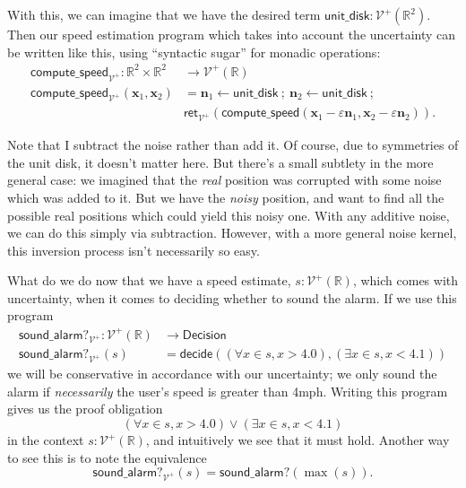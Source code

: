 \documentclass{article}           %
\newcommand{\R}{\mathbb{R}}
\newcommand{\Viet}{{\mathcal{V}^+}}
\newcommand{\ret}[1]{\mathsf{ret}_{#1}}
\newcommand{\ve}[1]{\mathbf{#1}}
\newcommand{\then}{\ ;\ }
\begin{document}
With this, we can imagine that we have the desired term $\mathsf{unit\_disk} : \Viet(\R^2)$. Then our speed estimation program which takes into account the uncertainty can be written like this, using ``syntactic sugar'' for monadic operations:
\begin{align*}
\mathsf{compute\_speed}_\Viet : \R^2 \times \R^2 &\to \Viet(\R)
\\ \mathsf{compute\_speed}_\Viet (\ve{x}_1, \ve{x}_2) &= 
  \ve{n}_1 \leftarrow \mathsf{unit\_disk} 
  \then
  \ve{n}_2 \leftarrow \mathsf{unit\_disk}
  \then
  \\ &\ret{\Viet} \left( \mathsf{compute\_speed}(\ve{x}_1 - \varepsilon \ve{n}_1, \ve{x}_2 - \varepsilon \ve{n}_2) \right).
\end{align*}

Note that I subtract the noise rather than add it. Of course, due to symmetries of the unit disk, it doesn't matter here. But there's a small subtlety in the more general case: we imagined that the \emph{real} position was corrupted with some noise which was added to it. But we have the \emph{noisy} position, and want to find all the possible real positions which could yield this noisy one. With any additive noise, we can do this simply via subtraction. However, with a more general noise kernel, this inversion process isn't necessarily so easy.

What do we do now that we have a speed estimate, $s : \Viet(\R)$, which comes with uncertainty, when it comes to deciding whether to sound the alarm. If we use this program
\begin{align*}
\mathsf{sound\_alarm?}_\Viet : \Viet(\R) &\to \mathsf{Decision}
\\ \mathsf{sound\_alarm?}_\Viet(s) &= \mathsf{decide}((\forall x \in s, x > 4.0) , (\exists x \in s, x < 4.1))
\end{align*}
we will be conservative in accordance with our uncertainty; we only sound the alarm if \emph{necessarily} the user's speed is greater than 4mph. Writing this program gives us the proof obligation
\[
\left( \forall x \in s, x > 4.0 \right) \vee \left( \exists x \in s, x < 4.1 \right)
\]
in the context $s : \Viet(\R)$, and intuitively we see that it must hold. Another way to see this is to note the equivalence 
\[
\mathsf{sound\_alarm?}_\Viet(s) = \mathsf{sound\_alarm?}(\max(s)).
\]
\end{document}
